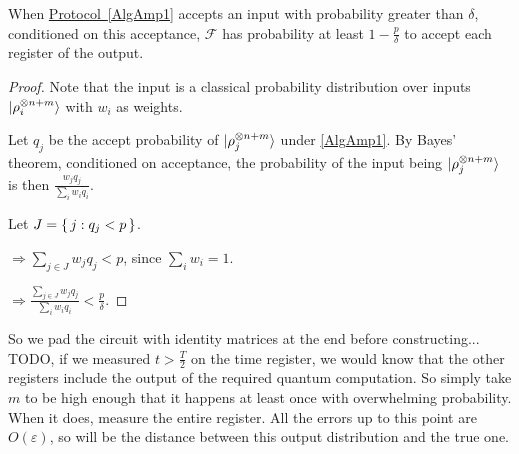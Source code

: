 \begin{theorem}
	When \hyperref[AlgAmp1]{Protocol~\ref*{AlgAmp1}} accepts an input with probability greater than $\delta$, conditioned on this acceptance, $\mathcal{F}$ has probability at least $1-\frac{p}{\delta}$ to accept each register of the output.
\end{theorem}
\begin{proof}
	Note that the input is a classical probability distribution over inputs $\ket{\rho_i^{\otimes n+m}}$ with $w_i$ as weights.

	Let $q_j$ be the accept probability of $\ket{\rho_j^{\otimes n+m}}$ under \autoref{AlgAmp1}. By Bayes' theorem, conditioned on acceptance, the probability of the input being $\ket{\rho_j^{\otimes n+m}}$ is then $\frac{w_j q_j}{\sum_i w_i q_i}$.

	Let $J=\set{j:q_j<p}$.

	$\Rightarrow\sum_{j\in J} w_j q_j<p$, since $\sum_i w_i=1$.
	
	$\Rightarrow\frac{\sum_{j\in J} w_j q_j}{\sum_i w_i q_i}<\frac{p}{\delta}$.
\end{proof}

So we pad the circuit with identity matrices at the end before constructing... TODO, if we measured $t>\frac{T}{2}$ on the time register, we would know that the other registers include the output of the required quantum computation. So simply take $m$ to be high enough that it happens at least once with overwhelming probability. When it does, measure the entire register. All the errors up to this point are $O(\varepsilon)$, so will be the distance between this output distribution and the true one.

